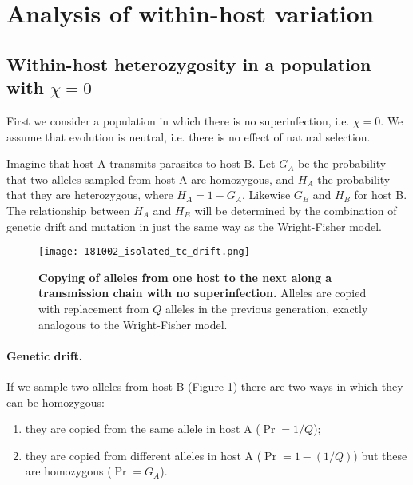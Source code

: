 \documentclass[_main.tex]{subfiles}
\begin{document}

\section{Analysis of within-host variation}

\subsection{Within-host heterozygosity in a population with $\chi=0$}
\label{supp_whh_chi_0}

First we consider a population in which there is no superinfection, i.e. $\chi = 0$.  We assume that evolution is neutral, i.e. there is no effect of natural selection.  

Imagine that host A transmits parasites to host B. Let $G_A$ be the probability that two alleles sampled from host A are homozygous, and $H_A$ the probability that they are heterozygous, where $H_A = 1 - G_A$.  Likewise $G_B$ and $H_B$ for host B.  The relationship between $H_A$ and $H_B$ will be determined by the combination of genetic drift and mutation in just the same way as the Wright-Fisher model.   

\begin{figure}[h!]
\centering
\texttt{[image: 181002\_isolated\_tc\_drift.png]}
\caption{\textbf{Copying of alleles from one host to the next along a transmission chain with no superinfection.}  Alleles are copied with replacement from $Q$ alleles in the previous generation, exactly analogous to the Wright-Fisher model.}
\label{fig:supp_hahb}
\end{figure}

\paragraph{Genetic drift.}  If we sample two alleles from host B (Figure \ref{fig:supp_hahb}) there are two ways in which they can be homozygous:

\begin{enumerate}[noitemsep]

\item they are copied from the same allele in host A ($ \Pr = 1 / Q $);
\item they are copied from different alleles in host A ($\Pr = 1 - (1/Q) $) but these are homozygous ($\Pr = G_A$).

\end{enumerate}
 
\end{document}
